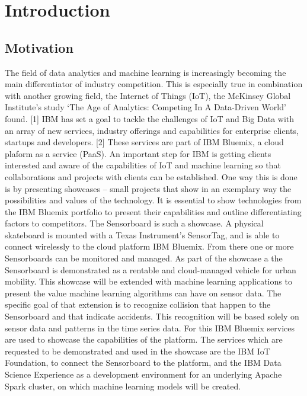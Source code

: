 \chapter{Introduction}
\label{ch:Introduction}

\section{Motivation}
\label{sec:Motivation}
The field of data analytics and machine learning is increasingly becoming the main differentiator of industry competition. This is especially true in combination with another growing field, the Internet of Things (IoT), the McKinsey Global Institute’s study ‘The Age of Analytics: Competing In A Data-Driven World’ found. [1] IBM has set a goal to tackle the challenges of IoT and Big Data with an array of new services, industry offerings and capabilities for enterprise clients, startups and developers. [2] These services are part of IBM Bluemix, a cloud plaform  as a service (PaaS). 
\newline
An important step for IBM is getting clients interested and aware of the capabilities of IoT and machine learning so that collaborations and projects with clients can be established. One way this is done is by presenting showcases – small projects that show in an exemplary way the possibilities and values of the technology. It is essential to show technologies from the IBM Bluemix portfolio to present their capabilities and outline differentiating factors to competitors.
 \newline
The Sensorboard is such a showcase. A physical skateboard is mounted with a Texas Instrument’s SensorTag, and is able to connect wirelessly to the cloud platform IBM Bluemix. From there one or more Sensorboards can be monitored and managed. As part of the showcase a the Sensorboard is demonstrated as a rentable and cloud-managed vehicle for urban mobility.
 \newline
This showcase will be extended with machine learning applications to present the value machine learning algorithms can have on sensor data. The specific goal of that extension is to recognize collision that happen to the Sensorboard and that indicate accidents. This recognition will be based solely on sensor data and  patterns in the time series data. For this IBM Bluemix services are used to showcase the capabilities of the platform. The services which are requested to be demonstrated and used in the showcase are the IBM IoT Foundation, to connect the Sensorboard to the platform, and the IBM Data Science Experience as a development environment for an underlying Apache Spark cluster, on which machine learning models will be created.

